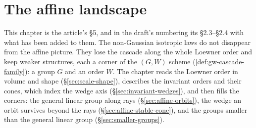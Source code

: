 %

\chapter{The affine landscape}
\label{ch:landscape}

This chapter is the article's \S 5, and in the draft's numbering its \S 2.3--\S 2.4 with what has
been added to them. The non-Gaussian isotropic laws do not disappear from the affine picture. They
lose the cascade along the whole Loewner order and keep weaker structures, each a corner of the
$(G, W)$ scheme (\ref{def:gw-cascade-family}): a group $G$ and an order $W$. The chapter reads the
Loewner order in volume and shape (\S\ref{sec:scale-shape}), describes the invariant orders and
their cones, which index the wedge axis (\S\ref{sec:invariant-wedges}), and then fills the corners:
the general linear group along rays (\S\ref{sec:affine-orbits}), the wedge an orbit survives beyond
the rays (\S\ref{sec:affine-stable-cone}), and the groups smaller than the general linear group
(\S\ref{sec:smaller-groups}).

